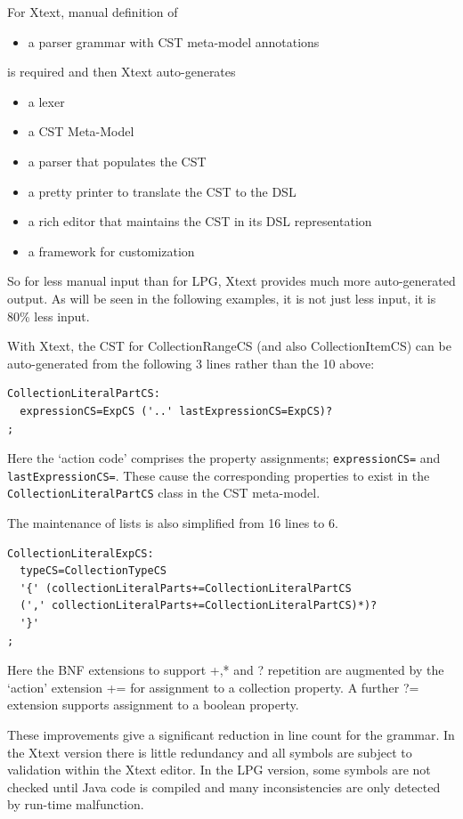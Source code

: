 \documentclass[runningheads,a4paper]{llncs}
\begin{document}
For Xtext, manual definition of
\begin{itemize}
\item a parser grammar with CST meta-model annotations
\end{itemize}
is required and then Xtext auto-generates
\begin{itemize}
\item a lexer 
\item a CST Meta-Model
\item a parser that populates the CST
\item a pretty printer to translate the CST to the DSL
\item a rich editor that maintains the CST in its DSL representation
\item a framework for customization
\end{itemize}

So for less manual input than for LPG, Xtext provides much more auto-generated output. As will be seen in the following examples, it is not just less input, it is 80\% less input.

With Xtext, the CST for CollectionRangeCS (and also CollectionItemCS) can be auto-generated from the following 3 lines rather than the 10 above:

{\small\begin{verbatim}
CollectionLiteralPartCS:
  expressionCS=ExpCS ('..' lastExpressionCS=ExpCS)?
;
\end{verbatim}}

Here the `action code' comprises the property assignments; \verb#expressionCS=# and \verb#lastExpressionCS=#. These cause the corresponding properties to exist in the \verb#CollectionLiteralPartCS# class in the CST meta-model.

The maintenance of lists is also simplified from 16 lines to 6. 

{\small\begin{verbatim}
CollectionLiteralExpCS:
  typeCS=CollectionTypeCS
  '{' (collectionLiteralParts+=CollectionLiteralPartCS
  (',' collectionLiteralParts+=CollectionLiteralPartCS)*)?
  '}'
;
\end{verbatim}}

Here the BNF extensions to support +,* and ? repetition are augmented by the `action' extension += for assignment to a collection property. A further ?= extension supports assignment to a boolean property.

These improvements give a significant reduction in line count for the grammar. In the Xtext version there is little redundancy and all symbols are subject to validation within the Xtext editor. In the LPG version, some symbols are not checked until Java code is compiled and many inconsistencies are only detected by run-time malfunction.
\end{document}
